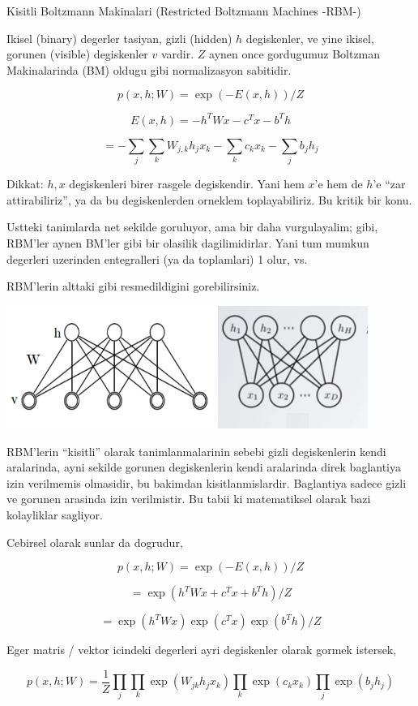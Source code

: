 \documentclass[12pt,fleqn]{article}\usepackage{../common}
\begin{document}
Kisitli Boltzmann Makinalari (Restricted Boltzmann Machines -RBM-)

Ikisel (binary) degerler tasiyan, gizli (hidden) $h$ degiskenler, ve yine
ikisel, gorunen (visible) degiskenler $v$ vardir. $Z$ aynen once gordugumuz
Boltzman Makinalarinda (BM) oldugu gibi normalizasyon sabitidir.

$$ p(x,h;W) = \exp (-E(x,h)) / Z $$

$$ E(x,h) = -h^TWx - c^Tx - b^Th $$

$$ = - \sum_j \sum_k W_{j,k}h_jx_k - \sum_k c_kx_k - \sum_j b_jh_j  $$

Dikkat: $h,x$ degiskenleri birer rasgele degiskendir. Yani hem $x$'e hem de
$h$'e ``zar attirabiliriz'', ya da bu degiskenlerden orneklem
toplayabiliriz. Bu kritik bir konu. 

Ustteki tanimlarda net sekilde goruluyor, ama bir daha vurgulayalim; gibi,
RBM'ler aynen BM'ler gibi bir olasilik dagilimidirlar. Yani tum mumkun
degerleri uzerinden entegralleri (ya da toplamlari) 1 olur, vs. 

RBM'lerin alttaki gibi resmedildigini gorebilirsiniz.

\includegraphics[height=4cm]{rbm_01.png}
\includegraphics[height=4cm]{rbm_02.png}

RBM'lerin ``kisitli'' olarak tanimlanmalarinin sebebi gizli degiskenlerin
kendi aralarinda, ayni sekilde gorunen degiskenlerin kendi aralarinda direk
baglantiya izin verilmemis olmasidir, bu bakimdan
kisitlanmislardir. Baglantiya sadece gizli ve gorunen arasinda izin
verilmistir. Bu tabii ki matematiksel olarak bazi kolayliklar sagliyor.

Cebirsel olarak sunlar da dogrudur,

$$ p(x,h;W) = \exp (-E(x,h)) / Z $$

$$ = \exp (h^TWx + c^Tx + b^Th ) / Z $$

$$ = \exp (h^TWx) \exp (c^Tx) \exp(b^Th) / Z $$

Eger matris / vektor icindeki degerleri ayri degiskenler olarak gormek
istersek, 

$$ 
p(x,h;W) = \frac{1}{Z}
\prod_j \prod_k \exp (W_{jk}h_jx_k) \prod_k \exp(c_kx_k) \prod_j \exp(b_jh_j) 
 $$
\end{document}
